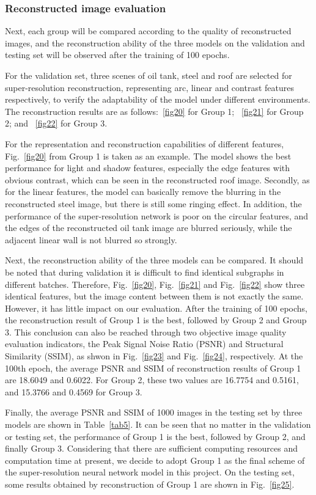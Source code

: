 \documentclass[10pt,twocolumn,letterpaper]{article}
\begin{document}
\subsubsection{Reconstructed image evaluation}
Next, each group will be compared according to the quality of reconstructed images, and the reconstruction ability of the three models on the validation and testing set will be observed after the training of 100 epochs.

For the validation set, three scenes of oil tank, steel and roof are selected for super-resolution reconstruction, representing arc, linear and contrast features respectively, to verify the adaptability of the model under different environments. The reconstruction results are as follows:~\ref{fig20} for Group 1; ~\ref{fig21} for Group 2; and ~\ref{fig22} for Group 3.

For the representation and reconstruction capabilities of different features, Fig.~\ref{fig20} from Group 1 is taken as an example. The model shows the best performance for light and shadow features, especially the edge features with obvious contrast, which can be seen in the reconstructed roof image. Secondly,  as for the linear features, the model can basically remove the blurring in the reconstructed steel image, but there is still some ringing effect. In addition, the performance of the super-resolution network is poor on the circular features, and the edges of the reconstructed oil tank image are blurred seriously, while the adjacent linear wall is not blurred so strongly.

Next, the reconstruction ability of the three models can be compared. It should be noted that during validation it is difficult to find identical subgraphs in different batches. Therefore, Fig.~\ref{fig20}, Fig.~\ref{fig21} and Fig.~\ref{fig22} show three identical features, but the image content between them is not exactly the same. However, it has little impact on our evaluation. After the training of 100 epochs, the reconstruction result of Group 1 is the best, followed by Group 2 and Group 3. This conclusion can also be reached through two objective image quality evaluation indicators, the Peak Signal Noise Ratio (PSNR) and Structural Similarity (SSIM), as shwon in Fig.~\ref{fig23} and Fig.~\ref{fig24}, respectively. At the 100th epoch, the average PSNR and SSIM of reconstruction results of Group 1 are 18.6049 and 0.6022. For Group 2, these two values are 16.7754 and 0.5161, and 15.3766 and 0.4569 for Group 3.

Finally, the average PSNR and SSIM of 1000 images in the testing set by three models are shown in Table~\ref{tab5}. It can be seen that no matter in the validation or testing set, the performance of Group 1 is the best, followed by Group 2, and finally Group 3. Considering that there are sufficient computing resources and computation time at present, we decide to adopt Group 1 as the final scheme of the super-resolution neural network model in this project. On the testing set, some results obtained by reconstruction of Group 1 are shown in Fig.~\ref{fig25}.
 
\end{document}
